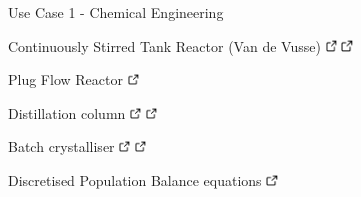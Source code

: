 \documentclass[compress,newPxFont,sthlmFooter]{beamer}
\begin{document}
\begin{frame}[plain]{Use Case 1 - Chemical Engineering}
    \begin{itemize}
       {\small
          \item \alert{Continuously Stirred Tank Reactor} (Van de Vusse)
                \href{https://doi.org/10.1021/i160048a700}{\includegraphics[align=b, height=0.8em]{link.png}} 
                \href{http://daetools.com/docs/tutorials-chemeng.html\#tutorial-che-1}{\includegraphics[align=b, height=0.8em]{link.png}}
          \item \alert{Plug Flow Reactor}
                \href{http://daetools.com/docs/tutorials-chemeng.html\#tutorial-che-7}{\includegraphics[align=b, height=0.8em]{link.png}}
          \item \alert{Distillation column}
                \href{http://dx.doi.org/10.1016/S0098-1354(02)00120-5}{\includegraphics[align=b, height=0.8em]{link.png}} 
                \href{http://daetools.com/docs/tutorials-chemeng.html\#tutorial-che-2}{\includegraphics[align=b, height=0.8em]{link.png}}
          \item \alert{Batch crystalliser}
                \href{http://dx.doi.org/10.1016/j.jcrysgro.2011.06.016}{\includegraphics[align=b, height=0.8em]{link.png}} 
                \href{http://daetools.com/docs/tutorials-chemeng.html\#tutorial-che-3}{\includegraphics[align=b, height=0.8em]{link.png}}
          \item \alert{Discretised Population Balance equations}
                \href{http://dx.doi.org/10.20944/preprints201611.0012.v1}{\includegraphics[align=b, height=0.8em]{link.png}} 
}
\end{itemize}
\end{frame}
\end{document}
